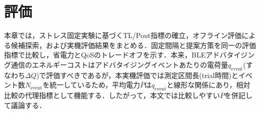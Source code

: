 ﻿%
\chapter{評価}
\label{ch:evaluation}
\clearpage

本章では，ストレス固定実験に基づくTL/Pout指標の確立，オフライン評価による候補探索，および実機評価結果をまとめる．固定間隔と提案方策を同一の評価指標で比較し，省電力とQoSのトレードオフを示す．本来，BLEアドバタイジング通信のエネルギーコストはアドバタイジングイベントあたりの電荷量$q_{\mathrm{event}}$(すなわち$\Delta Q$)で評価すべきであるが，本実機評価では測定区間長(trial時間)とイベント数$N_{\mathrm{event}}$を統一しているため，平均電力$\overline{P}$は$q_{\mathrm{event}}$と線形な関係にあり，相対比較の代理指標として機能する．したがって，本文では比較しやすい$\overline{P}$を併記して議論する．













